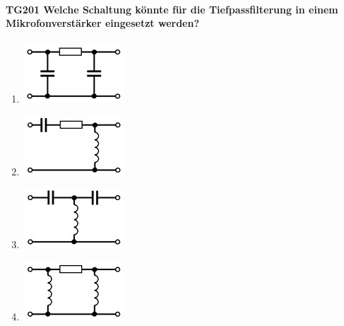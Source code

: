 \documentclass[8pt]{article}
\begin{document}
\paragraph*{TG201 Welche Schaltung könnte für die Tiefpassfilterung in einem Mikrofonverstärker eingesetzt werden?}
\begin{enumerate}[nolistsep,label=\Alph*]
\item
\begin{center}
	\begin{minipage}{\linewidth}
		\centering
		\includegraphics[scale=1.0]{pics/tg201_a.jpg}
	\end{minipage}
\end{center}
\item
\begin{center}
	\begin{minipage}{\linewidth}
		\centering
		\includegraphics[scale=1.0]{pics/tg201_b.jpg}
	\end{minipage}
\end{center}
\item
\begin{center}
	\begin{minipage}{\linewidth}
		\centering
		\includegraphics[scale=1.0]{pics/tg201_c.jpg}
	\end{minipage}
\end{center}
\item
\begin{center}
	\begin{minipage}{\linewidth}
		\centering
		\includegraphics[scale=1.0]{pics/tg201_d.jpg}
	\end{minipage}
\end{center}
\end{enumerate}
\end{document}

